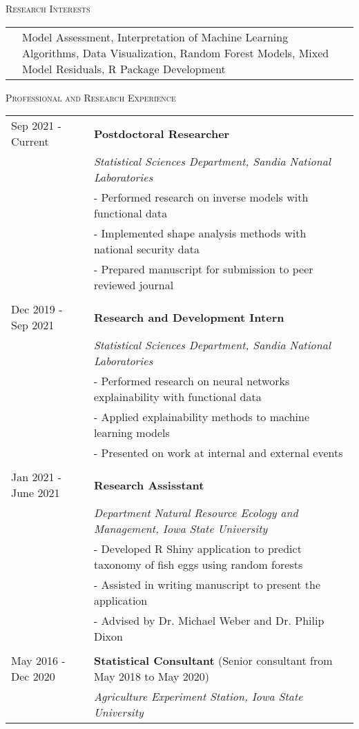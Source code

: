 \documentclass[10pt, oneside]{article}
\begin{document}
\noindent \textsc{Research Interests} \hrulefill
\begin{longtable}{p{3.5cm}p{13cm}}
& Model Assessment, Interpretation of Machine Learning Algorithms, Data Visualization, Random Forest Models, Mixed Model Residuals, R Package Development
\end{longtable}

\noindent \textsc{Professional and Research Experience} \hrulefill
\begin{longtable}{p{3.5cm}p{13cm}}
\hfill{Sep 2021 - Current} & \textbf{Postdoctoral Researcher}\\
& \emph{Statistical Sciences Department, Sandia National Laboratories} \vspace{0.1cm}\\
& - Performed research on inverse models with functional data\\
& - Implemented shape analysis methods with national security data\\
& - Prepared manuscript for submission to peer reviewed journal\\
\\
\hfill{Dec 2019 - Sep 2021} & \textbf{Research and Development Intern}\\
& \emph{Statistical Sciences Department, Sandia National Laboratories} \vspace{0.1cm}\\
& - Performed research on neural networks explainability with functional data\\
& - Applied explainability methods to machine learning models\\
& - Presented on work at internal and external events\\
\\
\hfill{Jan 2021 - June 2021} & \textbf{Research Assisstant}\\
& \emph{Department Natural Resource Ecology and Management, Iowa State University}\\
& - Developed R Shiny application to predict taxonomy of fish eggs using random forests\\
& - Assisted in writing manuscript to present the application\\
& - Advised by Dr. Michael Weber and Dr. Philip Dixon\\
\\
\hfill{May 2016 - Dec 2020} & \textbf{Statistical Consultant} (Senior consultant from May 2018 to May 2020)\\
& \emph{Agriculture Experiment Station, Iowa State University} \vspace{0.1cm}\\

\end{longtable}
\end{document}
